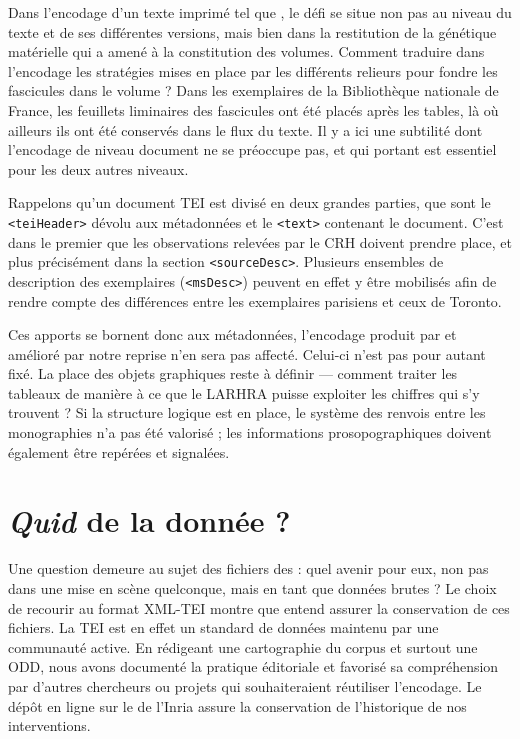 Dans l'encodage d'un texte imprimé tel que \lodm{}, le défi se situe non pas au niveau du texte et de ses différentes versions, mais bien dans la restitution de la génétique matérielle qui a amené à la constitution des volumes. Comment traduire dans l'encodage les stratégies mises en place par les différents relieurs pour fondre les fascicules dans le volume ? Dans les exemplaires de la Bibliothèque nationale de France, les feuillets liminaires des fascicules ont été placés après les tables, là où ailleurs ils ont été conservés dans le flux du texte. Il y a ici une subtilité dont l'encodage de niveau \og document \fg{} ne se préoccupe pas, et qui portant est essentiel pour les deux autres niveaux.

Rappelons qu'un document TEI est divisé en deux grandes parties, que sont le \texttt{<teiHeader>} dévolu aux métadonnées et le \texttt{<text>} contenant le document. C'est dans le premier que les observations relevées par le CRH doivent prendre place, et plus précisément dans la section \texttt{<sourceDesc>}. Plusieurs ensembles de description des exemplaires (\texttt{<msDesc>}) peuvent en effet y être mobilisés afin de rendre compte des différences entre les exemplaires parisiens et ceux de Toronto.

Ces apports se bornent donc aux métadonnées, l'encodage produit par \lse{} et amélioré par notre reprise n'en sera pas affecté. Celui-ci n'est pas pour autant fixé. La place des objets graphiques reste à définir --- comment traiter les tableaux de manière à ce que le LARHRA puisse exploiter les chiffres qui s'y trouvent ? Si la structure logique est en place, le système des renvois entre les monographies n'a pas été valorisé ; les informations prosopographiques doivent également être repérées et signalées.

\section{\textit{Quid} de la donnée ?}

Une question demeure au sujet des fichiers des \odm{} : quel avenir pour eux, non pas dans une mise en scène quelconque, mais en tant que données brutes ? Le choix de recourir au format XML-TEI montre que \timeus{} entend assurer la conservation de ces fichiers. La TEI est en effet un standard de données maintenu par une communauté active. En rédigeant une cartographie du corpus et surtout une ODD, nous avons documenté la pratique éditoriale et favorisé sa compréhension par d'autres chercheurs ou projets qui souhaiteraient réutiliser l'encodage. Le dépôt en ligne sur le \gitlab{} de l'Inria assure la conservation de l'historique de nos interventions.

